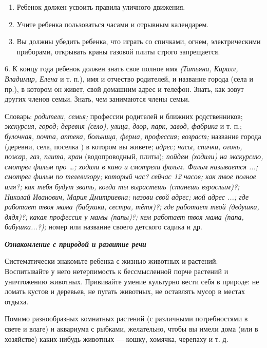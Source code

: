 \documentclass[a5paper]{book}
\renewcommand{\emph}[1]{\textit{#1}}
\begin{document}
\begin{enumerate}
\def\labelenumi{\arabic{enumi}.}
\setcounter{enumi}{2}
\item
  
  Ребенок должен усвоить правила уличного движения.
  
\item
  
  Учите ребенка пользоваться часами и отрывным календарем.
  
\item
  
  Вы должны убедить ребенка, что играть со спичками, огнем,
  электрическими приборами, открывать краны газовой плиты строго
  запрещается.
  
\end{enumerate}


6. К концу года ребенок должен знать свое полное имя \emph{(Татьяна,
Кирилл, Владимир, Елена} и т. п.), имя и отчество родителей, и название
города (села и пр.), в котором он живет, свой домашним адрес и телефон.
Знать, как зовут других членов семьи. Знать, чем занимаются члены семьи.

Словарь: \emph{родители, семья;} профессии родителей и ближних
родственников; \emph{экскурсия, город; деревня (село), улица, двор,
парк, завод, фабрика} и т. п.; \emph{булочная, почта, аптека, больница,
ферма, профессия; возраст;} название города (деревни, села, поселка ) в
котором вы живете; \emph{адрес; часы, спички, огонь, пожар, газ, плита,
кран} (водопроводный, плиты); \emph{пойдем (ходили) на экскурсию,
смотрел фильм про \ldots; ходили в кино и смотрели фильм. Фильм}
\emph{называется ...; смотрел фильм по телевизору; который час? сейчас
12 часов; как твое полное имя?; как тебя будут звать, когда ты вырастешь
(станешь взрослым)?; Николай Иванович, Мария Дмитриевна; назови свой
адрес; мой адрес ...; где работает твоя мама (бабушка, сестра, тётя)?;
где работает твой (дедушка, дядя)?; какая профессия у мамы (папы)?; кем
работает твоя мама (папа, бабушка...?);} номер или название своего
детского садика и др.

\emph{\textbf{Ознакомление с природой и развитие речи}}

Систематически знакомьте ребенка с жизнью животных и растений.
Воспитывайте у него нетерпимость к бессмысленной порче растений и
уничтожению животных. Прививайте умение культурно вести себя в природе:
не ломать кустов и деревьев, не пугать животных, не оставлять мусор в
местах отдыха.

Помимо разнообразных комнатных растений (с различными потребностями в
свете и влаге) и аквариума с рыбками, желательно, чтобы вы имели дома
(или в хозяйстве) каких-нибудь животных --- кошку, хомячка, черепаху и
т. д.
\end{document}
